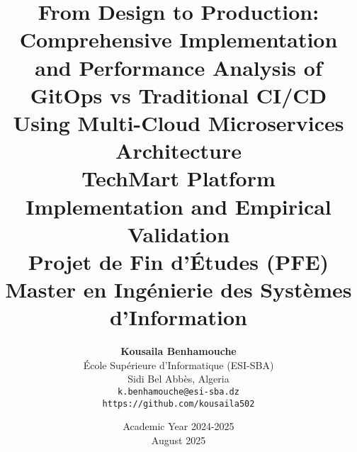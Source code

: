 \documentclass[12pt,a4paper,oneside]{report}
\title{
    \textbf{\Huge From Design to Production: Comprehensive Implementation and Performance Analysis of GitOps vs Traditional CI/CD Using Multi-Cloud Microservices Architecture}\\[0.5cm]
    \Large TechMart Platform Implementation and Empirical Validation\\[1cm]
    \large Projet de Fin d'Études (PFE)\\
    Master en Ingénierie des Systèmes d'Information
}
\author{
    \textbf{Kousaila Benhamouche}\\[0.3cm]
    École Supérieure d'Informatique (ESI-SBA)\\
    Sidi Bel Abbès, Algeria\\[0.5cm]
    \texttt{k.benhamouche@esi-sba.dz}\\
    \texttt{https://github.com/kousaila502}
}
\date{Academic Year 2024-2025\\August 2025}
\begin{document}
\maketitle





\tableofcontents

\listoffigures

\listoftables














\begin{appendices}




\end{appendices}
\end{document}
